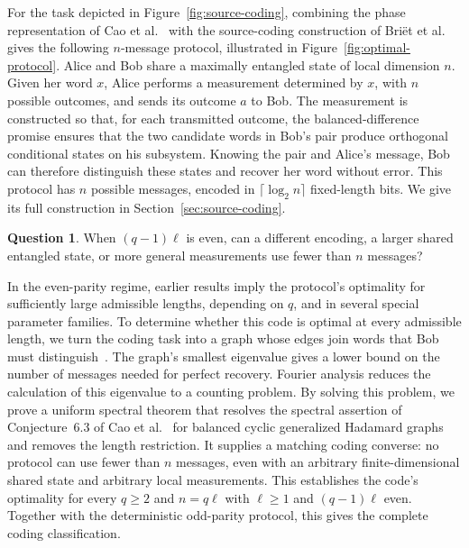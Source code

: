 \documentclass[11pt,a4paper]{article}
\numberwithin{equation}{section}
\numberwithin{figure}{section}
\numberwithin{table}{section}
\numberwithin{footnote}{section}
\theoremstyle{informal}\newtheorem*{informaltheorem}{Informal theorem}
\theoremstyle{definition}\newtheorem{example}{Example}[section]
\newtheorem*{question}{Question}
\theoremstyle{remark}\newtheorem{remark}[theorem]{Remark}
\begin{document}
For the task depicted in Figure~\ref{fig:source-coding},
combining the phase representation of Cao et al.~\cite[Lemma~4.1]{cao}
with the source-coding construction of Bri\"et et al.~\cite[Lemma~5.1]{bblps}
gives the following \(n\)-message protocol, illustrated in
Figure~\ref{fig:optimal-protocol}. Alice and Bob share a
maximally entangled state of local dimension \(n\). Given her word
\(x\), Alice performs a measurement determined by \(x\), with \(n\)
possible outcomes, and sends its outcome \(a\) to Bob. The measurement is
constructed so that, for each transmitted outcome, the balanced-difference
promise ensures that the two candidate words in Bob's pair produce
orthogonal conditional states on his subsystem. Knowing the pair and
Alice's message, Bob can therefore distinguish these states and recover
her word without error. This protocol has \(n\) possible messages,
encoded in \(\lceil\log_2 n\rceil\) fixed-length bits. We give its full
construction in Section~\ref{sec:source-coding}.

\begin{question}
When \((q-1)\ell\) is even, can a different encoding, a larger
shared entangled state, or more general measurements use fewer
than \(n\) messages?
\end{question}

In the even-parity regime, earlier results imply
the protocol's optimality for sufficiently large admissible lengths, depending
on \(q\), and in several special parameter families. To determine
whether this code is optimal at every admissible length, we turn the
coding task into a graph whose edges join words that Bob must
distinguish~\cite{wits,fb}. The graph's smallest eigenvalue gives a lower bound on the number of
messages needed for perfect recovery. Fourier analysis reduces the
calculation of this eigenvalue to a counting problem. By solving this
problem, we prove a uniform spectral theorem that resolves the spectral
assertion of Conjecture~6.3 of Cao et al.~\cite{cao} for balanced cyclic
generalized Hadamard graphs and removes the length restriction. It supplies a
matching coding converse: no protocol can use fewer than \(n\) messages,
even with an arbitrary finite-dimensional shared state and arbitrary
local measurements. This establishes the code's optimality for every \(q\geq2\) and
\(n=q\ell\) with \(\ell\geq1\) and \((q-1)\ell\) even.
Together with the deterministic odd-parity protocol, this gives the
complete coding classification.
\end{document}
